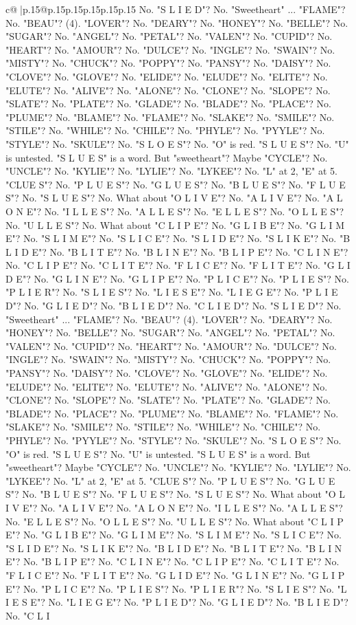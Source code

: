 \documentclass{article}
\begin{document}
{\begin{supertabular}{c@{$\;$}|p{.15\linewidth}@{}p{.15\linewidth}p{.15\linewidth}p{.15\linewidth}p{.15\linewidth}p{.15\linewidth}}
{{{No. "S L I E D"? No. "Sweetheart" ... "FLAME"? No. "BEAU"? (4). "LOVER"? No. "DEARY"? No. "HONEY"? No. "BELLE"? No. "SUGAR"? No. "ANGEL"? No. "PETAL"? No. "VALEN"? No. "CUPID"? No. "HEART"? No. "AMOUR"? No. "DULCE"? No. "INGLE"? No. "SWAIN"? No. "MISTY"? No. "CHUCK"? No. "POPPY"? No. "PANSY"? No. "DAISY"? No. "CLOVE"? No. "GLOVE"? No. "ELIDE"? No. "ELUDE"? No. "ELITE"? No. "ELUTE"? No. "ALIVE"? No. "ALONE"? No. "CLONE"? No. "SLOPE"? No. "SLATE"? No. "PLATE"? No. "GLADE"? No. "BLADE"? No. "PLACE"? No. "PLUME"? No. "BLAME"? No. "FLAME"? No. "SLAKE"? No. "SMILE"? No. "STILE"? No. "WHILE"? No. "CHILE"? No. "PHYLE"? No. "PYYLE"? No. "STYLE"? No. "SKULE"? No. "S L O E S"? No. "O" is red. "S L U E S"? No. "U" is untested. "S L U E S" is a word. But "sweetheart"? Maybe "CYCLE"? No. "UNCLE"? No. "KYLIE"? No. "LYLIE"? No. "LYKEE"? No. "L" at 2, "E" at 5. "CLUE S"? No. "P L U E S"? No. "G L U E S"? No. "B L U E S"? No. "F L U E S"? No. "S L U E S"? No. What about "O L I V E"? No. "A L I V E"? No. "A L O N E"? No. "I L L E S"? No. "A L L E S"? No. "E L L E S"? No. "O L L E S"? No. "U L L E S"? No. What about "C L I P E"? No. "G L I B E"? No. "G L I M E"? No. "S L I M E"? No. "S L I C E"? No. "S L I D E"? No. "S L I K E"? No. "B L I D E"? No. "B L I T E"? No. "B L I N E"? No. "B L I P E"? No. "C L I N E"? No. "C L I P E"? No. "C L I T E"? No. "F L I C E"? No. "F L I T E"? No. "G L I D E"? No. "G L I N E"? No. "G L I P E"? No. "P L I C E"? No. "P L I E S"? No. "P L I E R"? No. "S L I E S"? No. "L I E S E"? No. "L I E G E"? No. "P L I E D"? No. "G L I E D"? No. "B L I E D"? No. "C L I E D"? No. "S L I E D"? No. "Sweetheart" ... "FLAME"? No. "BEAU"? (4). "LOVER"? No. "DEARY"? No. "HONEY"? No. "BELLE"? No. "SUGAR"? No. "ANGEL"? No. "PETAL"? No. "VALEN"? No. "CUPID"? No. "HEART"? No. "AMOUR"? No. "DULCE"? No. "INGLE"? No. "SWAIN"? No. "MISTY"? No. "CHUCK"? No. "POPPY"? No. "PANSY"? No. "DAISY"? No. "CLOVE"? No. "GLOVE"? No. "ELIDE"? No. "ELUDE"? No. "ELITE"? No. "ELUTE"? No. "ALIVE"? No. "ALONE"? No. "CLONE"? No. "SLOPE"? No. "SLATE"? No. "PLATE"? No. "GLADE"? No. "BLADE"? No. "PLACE"? No. "PLUME"? No. "BLAME"? No. "FLAME"? No. "SLAKE"? No. "SMILE"? No. "STILE"? No. "WHILE"? No. "CHILE"? No. "PHYLE"? No. "PYYLE"? No. "STYLE"? No. "SKULE"? No. "S L O E S"? No. "O" is red. "S L U E S"? No. "U" is untested. "S L U E S" is a word. But "sweetheart"? Maybe "CYCLE"? No. "UNCLE"? No. "KYLIE"? No. "LYLIE"? No. "LYKEE"? No. "L" at 2, "E" at 5. "CLUE S"? No. "P L U E S"? No. "G L U E S"? No. "B L U E S"? No. "F L U E S"? No. "S L U E S"? No. What about "O L I V E"? No. "A L I V E"? No. "A L O N E"? No. "I L L E S"? No. "A L L E S"? No. "E L L E S"? No. "O L L E S"? No. "U L L E S"? No. What about "C L I P E"? No. "G L I B E"? No. "G L I M E"? No. "S L I M E"? No. "S L I C E"? No. "S L I D E"? No. "S L I K E"? No. "B L I D E"? No. "B L I T E"? No. "B L I N E"? No. "B L I P E"? No. "C L I N E"? No. "C L I P E"? No. "C L I T E"? No. "F L I C E"? No. "F L I T E"? No. "G L I D E"? No. "G L I N E"? No. "G L I P E"? No. "P L I C E"? No. "P L I E S"? No. "P L I E R"? No. "S L I E S"? No. "L I E S E"? No. "L I E G E"? No. "P L I E D"? No. "G L I E D"? No. "B L I E D"? No. "C L I }}}
\end{supertabular}}
\end{document}
